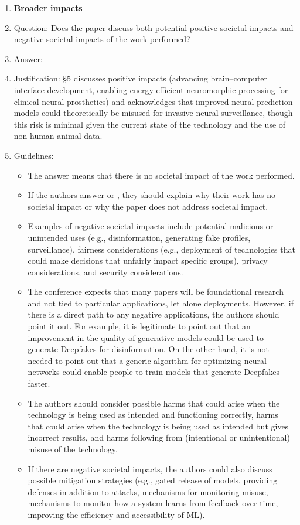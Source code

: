 \begin{enumerate}
\item {\bf Broader impacts}
    \item[] Question: Does the paper discuss both potential positive societal impacts and negative societal impacts of the work performed?
    \item[] Answer: \answerYes{}
    \item[] Justification: \S5 discusses positive impacts (advancing
      brain--computer interface development, enabling energy-efficient
      neuromorphic processing for clinical neural prosthetics) and
      acknowledges that improved neural prediction models could
      theoretically be misused for invasive neural surveillance,
      though this risk is minimal given the current state of the
      technology and the use of non-human animal data.
    \item[] Guidelines:
    \begin{itemize}
        \item The answer \answerNA{} means that there is no societal impact of the work performed.
        \item If the authors answer \answerNA{} or \answerNo, they should explain why their work has no societal impact or why the paper does not address societal impact.
        \item Examples of negative societal impacts include potential malicious or unintended uses (e.g., disinformation, generating fake profiles, surveillance), fairness considerations (e.g., deployment of technologies that could make decisions that unfairly impact specific groups), privacy considerations, and security considerations.
        \item The conference expects that many papers will be foundational research and not tied to particular applications, let alone deployments. However, if there is a direct path to any negative applications, the authors should point it out. For example, it is legitimate to point out that an improvement in the quality of generative models could be used to generate Deepfakes for disinformation. On the other hand, it is not needed to point out that a generic algorithm for optimizing neural networks could enable people to train models that generate Deepfakes faster.
        \item The authors should consider possible harms that could arise when the technology is being used as intended and functioning correctly, harms that could arise when the technology is being used as intended but gives incorrect results, and harms following from (intentional or unintentional) misuse of the technology.
        \item If there are negative societal impacts, the authors could also discuss possible mitigation strategies (e.g., gated release of models, providing defenses in addition to attacks, mechanisms for monitoring misuse, mechanisms to monitor how a system learns from feedback over time, improving the efficiency and accessibility of ML).
    \end{itemize}
    

\end{enumerate}
